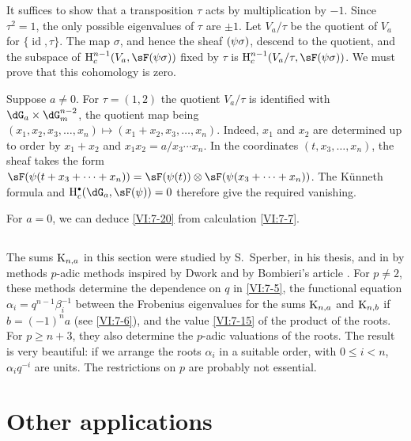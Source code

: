 It suffices to show that a transposition $\tau$ acts by multiplication 
by $-1$. Since $\tau^2=1$, the only possible eigenvalues of $\tau$ are 
$\pm 1$. Let $V_a/\tau$ be the quotient of $V_a$ for 
$\{\operatorname{id},\tau\}$. The map $\sigma$, and hence the sheaf 
$\sf(\psi\sigma)$, descend to the quotient, and the subspace of 
  $\h_c^{n-1}(V_a,\sF(\psi\sigma))$ fixed by 
$\tau$ is $\h_c^{n-1}(V_a/\tau,\sF(\psi\sigma))$. We must prove that 
this cohomology is zero. 

Suppose $a\ne 0$. For $\tau=(1,2)$ the quotient $V_a/\tau$ is identified 
with $\dG_a\times \dG_m^{n-2}$, the quotient map being 
$(x_1,x_2,x_3,\dots,x_n)\mapsto (x_1+x_2,x_3,\dots,x_n)$. Indeed, $x_1$ and 
$x_2$ are determined up to order by $x_1+x_2$ and 
$x_1x_2 = a/x_3\dotsm x_n$. In the coordinates $(t,x_3,\dots,x_n)$, the 
sheaf takes the form 
$\sF(\psi(t+x_3+\cdots + x_n)) = \sF(\psi(t))\otimes \sF(\psi(x_3+\cdots + x_n))$. 
  The K\"unneth formula and $\h_c^\bullet(\dG_a,\sF(\psi)) = 0$ therefore give 
the required vanishing. 

For $a=0$, we can deduce \ref{VI:7-20} from calculation \ref{VI:7-7}. 





\subsection{}\label{VI:7-21}

The sums $\textnormal{K}_{n,a}$ in this section were studied by 
S.\ Sperber, in his thesis, and in \cite{sp77} by methods 
$p$-adic methods inspired by Dwork and by Bombieri's article \cite{bo66}. 
For $p\ne 2$, these methods determine the dependence on $q$ in \ref{VI:7-5}, 
the functional equation $\alpha_i = q^{n-1} \beta_i^{-1}$ between the 
Frobenius eigenvalues for the sums $\textnormal{K}_{n,a}$ and 
$\textnormal{K}_{n,b}$ if $b=(-1)^n a$ (see \ref{VI:7-6}), and the value \ref{VI:7-15} 
of the product of the roots. For $p\geqslant n+3$, they also determine the 
$p$-adic valuations of the roots. The result is very beautiful: if we arrange 
the roots $\alpha_i$ in a suitable order, with 
  $0\leqslant i<n$, $\alpha_i q^{-i}$ are units. The 
restrictions on $p$ are probably not essential. 










\section{Other applications}\label{VI:8}





